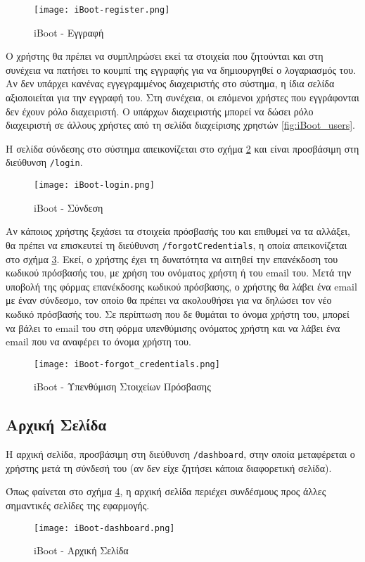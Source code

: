 \begin{figure}[ht]
	\centering
	\texttt{[image: iBoot-register.png]}
	\caption{iBoot - Εγγραφή}
	\label{fig:iBoot_register}
\end{figure}
Ο χρήστης θα πρέπει να συμπληρώσει εκεί τα στοιχεία που ζητούνται και στη συνέχεια να πατήσει το κουμπί της εγγραφής για να δημιουργηθεί ο λογαριασμός του. Αν δεν υπάρχει κανένας εγγεγραμμένος διαχειριστής στο σύστημα, η ίδια σελίδα αξιοποιείται για την εγγραφή του. Στη συνέχεια, οι επόμενοι χρήστες που εγγράφονται δεν έχουν ρόλο διαχειριστή. Ο υπάρχων διαχειριστής μπορεί να δώσει ρόλο διαχειριστή σε άλλους χρήστες από τη σελίδα διαχείρισης χρηστών \ref{fig:iBoot_users}.

Η σελίδα σύνδεσης στο σύστημα απεικονίζεται στο σχήμα \ref{fig:iBoot_login} και είναι προσβάσιμη στη διεύθυνση \verb!/login!.
\begin{figure}[ht]
	\centering
	\texttt{[image: iBoot-login.png]}
	\caption{iBoot - Σύνδεση}
	\label{fig:iBoot_login}
\end{figure}

Αν κάποιος χρήστης ξεχάσει τα στοιχεία πρόσβασής του και επιθυμεί να τα αλλάξει, θα πρέπει να επισκευτεί τη διεύθυνση \verb!/forgotCredentials!, η οποία απεικονίζεται στο σχήμα \ref{fig:iBoot_forgot_credentials}. Εκεί, ο χρήστης έχει τη δυνατότητα να αιτηθεί την επανέκδοση του κωδικού πρόσβασής του, με χρήση του ονόματος χρήστη ή του email του. Μετά την υποβολή της φόρμας επανέκδοσης κωδικού πρόσβασης, ο χρήστης θα λάβει ένα email με έναν σύνδεσμο, τον οποίο θα πρέπει να ακολουθήσει για να δηλώσει τον νέο κωδικό πρόσβασής του. Σε περίπτωση που δε θυμάται το όνομα χρήστη του, μπορεί να βάλει το email του στη φόρμα υπενθύμισης ονόματος χρήστη και να λάβει ένα email που να αναφέρει το όνομα χρήστη του.
\begin{figure}[ht]
	\centering
	\texttt{[image: iBoot-forgot\_credentials.png]}
	\caption{iBoot - Υπενθύμιση Στοιχείων Πρόσβασης}
	\label{fig:iBoot_forgot_credentials}
\end{figure}
\FloatBarrier

\subsection{Αρχική Σελίδα}
\FloatBarrier
Η αρχική σελίδα, προσβάσιμη στη διεύθυνση \verb!/dashboard!, στην οποία μεταφέρεται ο χρήστης μετά τη σύνδεσή του (αν δεν είχε ζητήσει κάποια διαφορετική σελίδα).

Όπως φαίνεται στο σχήμα \ref{fig:iBoot_dashboard}, η αρχική σελίδα περιέχει συνδέσμους προς άλλες σημαντικές σελίδες της εφαρμογής.
\begin{figure}[ht]
	\centering
	\texttt{[image: iBoot-dashboard.png]}
	\caption{iBoot - Αρχική Σελίδα}
	\label{fig:iBoot_dashboard}
\end{figure}
\FloatBarrier

